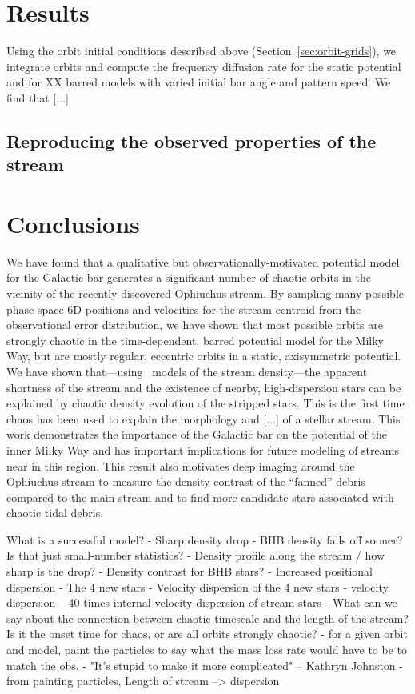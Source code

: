 \documentclass[letterpaper,12pt,preprint]{aastex}
\begin{document}
\section{Results}

Using the orbit initial conditions described above (Section~\ref{sec:orbit-grids}), we integrate orbits and compute the frequency diffusion rate for the static potential and for XX barred models with varied initial bar angle and pattern speed. We find that [...] 

\subsection{Reproducing the observed properties of the stream}\label{sec:results2}

\section{Conclusions}\label{sec:conclusions}

We have found that a qualitative but observationally-motivated potential model for the Galactic bar generates a significant number of chaotic orbits in the vicinity of the recently-discovered Ophiuchus stream. By sampling many possible phase-space 6D positions and velocities for the stream centroid from the observational error distribution, we have shown that most possible orbits are strongly chaotic in the time-dependent, barred potential model for the Milky Way, but are mostly regular, eccentric orbits in a static, axisymmetric potential. We have shown that---using \streakline\ models of the stream density---the apparent shortness of the stream and the existence of nearby, high-dispersion stars can be explained by chaotic density evolution of the stripped stars. This is the first time chaos has been used to explain the morphology and [...] of a stellar stream. This work demonstrates the importance of the Galactic bar on the potential of the inner Milky Way and has important implications for future modeling of streams near in this region. This result also motivates deep imaging around the Ophiuchus stream to measure the density contrast of the ``fanned'' debris compared to the main stream and to find more candidate stars associated with chaotic tidal debris.

What is a successful model?
- Sharp density drop
	- BHB density falls off sooner? Is that just small-number statistics?
	- Density profile along the stream / how sharp is the drop?
	- Density contrast for BHB stars?
- Increased positional dispersion
	- The 4 new stars
- Velocity dispersion of the 4 new stars
	- velocity dispersion ~ 40 times internal velocity dispersion of stream stars
- What can we say about the connection between chaotic timescale and the length of the stream? Is it the onset time for chaos, or are all orbits strongly chaotic?
	- for a given orbit and model, paint the particles to say what the mass loss rate would have to be to match the obs.
- "It's stupid to make it more complicated" -- Kathryn Johnston
- from painting particles, Length of stream --> dispersion
\end{document}
